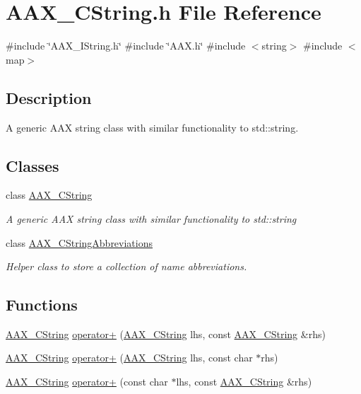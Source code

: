 \hypertarget{a00476}{}\section{A\+A\+X\+\_\+\+C\+String.\+h File Reference}
\label{a00476}
{\ttfamily \#include \char`\"{}A\+A\+X\+\_\+\+I\+String.\+h\char`\"{}}\newline
{\ttfamily \#include \char`\"{}A\+A\+X.\+h\char`\"{}}\newline
{\ttfamily \#include $<$string$>$}\newline
{\ttfamily \#include $<$map$>$}\newline


\subsection{Description}
A generic A\+AX string class with similar functionality to std\+::string. 

\subsection*{Classes}
\begin{DoxyCompactItemize}
\item 
class \mbox{\hyperlink{a01573}{A\+A\+X\+\_\+\+C\+String}}
\begin{DoxyCompactList}\small\item\em A generic A\+AX string class with similar functionality to {\ttfamily std\+::string} \end{DoxyCompactList}\item 
class \mbox{\hyperlink{a01577}{A\+A\+X\+\_\+\+C\+String\+Abbreviations}}
\begin{DoxyCompactList}\small\item\em Helper class to store a collection of name abbreviations. \end{DoxyCompactList}\end{DoxyCompactItemize}
\subsection*{Functions}
\begin{DoxyCompactItemize}
\item 
\mbox{\hyperlink{a01573}{A\+A\+X\+\_\+\+C\+String}} \mbox{\hyperlink{a00476_a5bf83a824cd277ac11bd58486a49ce1d}{operator+}} (\mbox{\hyperlink{a01573}{A\+A\+X\+\_\+\+C\+String}} lhs, const \mbox{\hyperlink{a01573}{A\+A\+X\+\_\+\+C\+String}} \&rhs)
\item 
\mbox{\hyperlink{a01573}{A\+A\+X\+\_\+\+C\+String}} \mbox{\hyperlink{a00476_a8e2b213f22b3491833529fede1e9af40}{operator+}} (\mbox{\hyperlink{a01573}{A\+A\+X\+\_\+\+C\+String}} lhs, const char $\ast$rhs)
\item 
\mbox{\hyperlink{a01573}{A\+A\+X\+\_\+\+C\+String}} \mbox{\hyperlink{a00476_ac422f2c6ebf5186deec4a94480709747}{operator+}} (const char $\ast$lhs, const \mbox{\hyperlink{a01573}{A\+A\+X\+\_\+\+C\+String}} \&rhs)
\end{DoxyCompactItemize}


